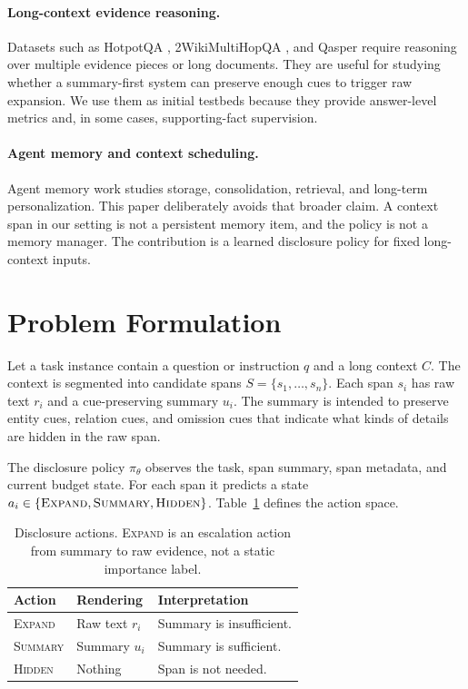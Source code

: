 \documentclass[11pt]{article}
\newcommand{\expandact}{\textsc{Expand}}
\newcommand{\summaryact}{\textsc{Summary}}
\newcommand{\hiddenact}{\textsc{Hidden}}
\begin{document}
\paragraph{Long-context evidence reasoning.}
Datasets such as HotpotQA \citep{yang2018hotpotqa}, 2WikiMultiHopQA \citep{ho2020constructing}, and Qasper \citep{dasigi2021qasper} require reasoning over multiple evidence pieces or long documents. They are useful for studying whether a summary-first system can preserve enough cues to trigger raw expansion. We use them as initial testbeds because they provide answer-level metrics and, in some cases, supporting-fact supervision.

\paragraph{Agent memory and context scheduling.}
Agent memory work studies storage, consolidation, retrieval, and long-term personalization. This paper deliberately avoids that broader claim. A context span in our setting is not a persistent memory item, and the policy is not a memory manager. The contribution is a learned disclosure policy for fixed long-context inputs.

\section{Problem Formulation}

Let a task instance contain a question or instruction $q$ and a long context $C$. The context is segmented into candidate spans $S = \{s_1,\ldots,s_n\}$. Each span $s_i$ has raw text $r_i$ and a cue-preserving summary $u_i$. The summary is intended to preserve entity cues, relation cues, and omission cues that indicate what kinds of details are hidden in the raw span.

The disclosure policy $\pi_\theta$ observes the task, span summary, span metadata, and current budget state. For each span it predicts a state $a_i \in \{\expandact{}, \summaryact{}, \hiddenact{}\}$. Table~\ref{tab:actions} defines the action space.

\begin{table}[t]
\centering
\small
\begin{tabular}{lll}
\toprule
Action & Rendering & Interpretation \\
\midrule
\expandact{} & Raw text $r_i$ & Summary is insufficient. \\
\summaryact{} & Summary $u_i$ & Summary is sufficient. \\
\hiddenact{} & Nothing & Span is not needed. \\
\bottomrule
\end{tabular}
\caption{Disclosure actions. \expandact{} is an escalation action from summary to raw evidence, not a static importance label.}
\label{tab:actions}
\end{table}
\end{document}

